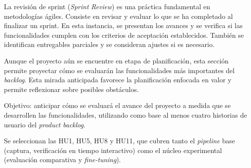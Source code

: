 \documentclass[
  11pt, %
]{charter}
\begin{document}
La revisión de sprint (\textit{Sprint Review}) es una práctica fundamental en metodologías ágiles. Consiste en revisar y evaluar lo que se ha completado al finalizar un sprint. En esta instancia, se presentan los avances y se verifica si las funcionalidades cumplen con los criterios de aceptación establecidos. También se identifican entregables parciales y se consideran ajustes si es necesario.

Aunque el proyecto aún se encuentre en etapa de planificación, esta sección permite proyectar cómo se evaluarán las funcionalidades más importantes del \textit{backlog}. Esta mirada anticipada favorece la planificación enfocada en valor y permite reflexionar sobre posibles obstáculos.

Objetivo: anticipar cómo se evaluará el avance del proyecto a medida que se desarrollen las funcionalidades, utilizando como base al menos cuatro historias de usuario del \textit{product backlog}.

Se seleccionan las HU1, HU5, HU8 y HU11, que cubren tanto el \textit{pipeline} base (captura, verificación en tiempo interactivo) como el núcleo experimental (evaluación comparativa y \textit{fine-tuning}).
\end{document}
